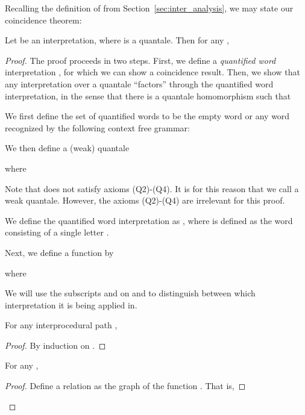   Recalling the definition of  from
   Section~\ref{sec:inter_analysis}, we may state our coincidence theorem:
   \begin{theorem}[Coincidence] \label{thm:coincidence}
     Let  be an
     interpretation, where  is a quantale.  Then for any ,
     
   \end{theorem}
   \begin{proof}
     The proof proceeds in two steps.  First, we define a \emph{quantified
       word} interpretation , for which we can show a coincidence
     result.  Then, we show that any interpretation  over a quantale
     ``factors'' through the quantified word interpretation, in the sense that
     there is a quantale homomorphism  such that
     

     We first define the set of quantified words  to be the empty word or
     any word recognized by the following context free grammar:
     
     We then define a (weak) quantale
     
     where
     
     Note that  does not satisfy axioms (Q2)-(Q4).  It is for
     this reason that we call  a weak quantale.  However, the
     axioms (Q2)-(Q4) are irrelevant for this proof.

     We define the quantified word interpretation as , where
      is defined as the word consisting of a single
     letter .

     Next, we define a function  by
     
     where
     

     We will use the subscripts  and  on
      and  to distinguish between which
     interpretation it is being applied in.

     \begin{lemma} \label{lem:flatten}
       For any interprocedural path ,
       
     \end{lemma}
     \begin{proof}
       By induction on .
     \end{proof}

     \begin{lemma} \label{lem:factor}
       For any ,
       
     \end{lemma}
     \begin{proof}
       Define a relation  as
       the graph of the function .  That is,
       

\end{proof}
\end{proof}
